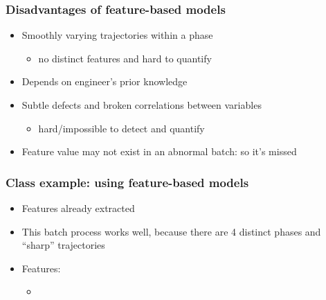 \documentclass[handout, 12pt]{beamer}
\begin{document}
\begin{frame}\frametitle{Disadvantages of feature-based models}

\begin{itemize}
	\item	Smoothly varying trajectories within a phase
	
			\begin{itemize}
				\item	no distinct features and hard to quantify
			\end{itemize}
			
	
	\item	Depends on engineer's prior knowledge
	
	\item	Subtle defects and broken correlations between variables 
	
			\begin{itemize}
				\item	hard/impossible to detect and quantify
			\end{itemize}
			

	\item	Feature value may not exist in an abnormal batch: so it's missed
	
\end{itemize}
\end{frame}

\begin{frame}\frametitle{Class example: using feature-based models}

\begin{itemize}
	\item	Features already extracted
	
	\item	This batch process works well, because there are 4 distinct phases and ``sharp'' trajectories
	
	
	\item	Features:
	
			\begin{itemize}
				\item	{}
			\end{itemize}
\end{itemize}




\end{frame}
\end{document}
